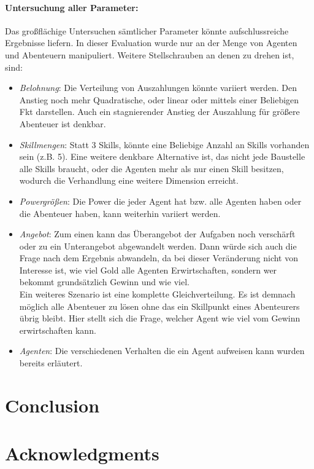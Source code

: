 \documentclass[fleqn,10pt]{SelfArx} %
\begin{document}
\paragraph{Untersuchung aller Parameter:}
Das großflächige Untersuchen sämtlicher Parameter könnte aufschlussreiche Ergebnisse liefern. In dieser Evaluation wurde nur an der Menge von Agenten und Abenteuern manipuliert. Weitere Stellschrauben an denen zu drehen ist, sind:
\begin{itemize}
	\item \textit{Belohnung}: Die Verteilung von Auszahlungen könnte variiert werden. Den Anstieg noch mehr Quadratische, oder linear oder mittels einer Beliebigen Fkt darstellen. Auch ein stagnierender Anstieg der Auszahlung für größere Abenteuer ist denkbar.
	\item \textit{Skillmengen}: Statt 3 Skills, könnte eine Beliebige Anzahl an Skills vorhanden sein (z.B. 5). Eine weitere denkbare Alternative ist, das nicht jede Baustelle alle Skills braucht, oder die Agenten mehr als nur einen Skill besitzen, wodurch die Verhandlung eine weitere Dimension erreicht. 
	\item \textit{Powergrößen}: Die Power die jeder Agent hat bzw. alle Agenten haben oder die Abenteuer haben, kann weiterhin variiert werden.
	\item \textit{Angebot}: Zum einen kann das Überangebot der Aufgaben noch verschärft oder zu ein Unterangebot abgewandelt werden. Dann würde sich auch die Frage nach dem Ergebnis abwandeln, da bei dieser Veränderung nicht von Interesse ist, wie viel Gold alle Agenten Erwirtschaften, sondern wer bekommt grundsätzlich Gewinn und wie viel. \\
	Ein weiteres Szenario ist eine komplette Gleichverteilung. Es ist demnach möglich alle Abenteuer zu lösen ohne das ein Skillpunkt eines Abenteurers übrig bleibt. Hier stellt sich die Frage, welcher Agent wie viel vom Gewinn erwirtschaften kann.
	\item \textit{Agenten}: Die verschiedenen Verhalten die ein Agent aufweisen kann wurden bereits erläutert.
\end{itemize}




\section{Conclusion}
\label{sec:Conclusion}

\section*{Acknowledgments} %
\end{document}
